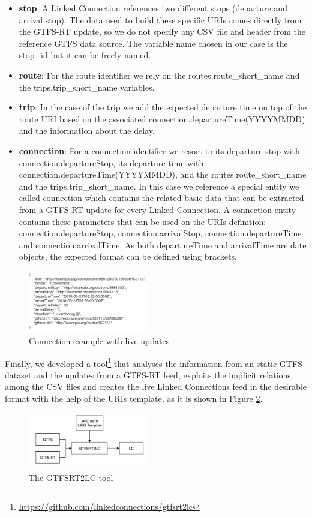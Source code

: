\documentclass[sw]{iosart2x}
\begin{document}
	\begin{itemize}
	\item \textbf{stop}: A Linked Connection references two different stops (departure and arrival stop). The data used to build these specific URIs comes directly from the GTFS-RT update, so we do not specify any CSV file and header from the reference GTFS data source. The variable name chosen in our case is the stop\_id but it can be freely named.
	\item \textbf{route}: For the route identifier we rely on the routes.route\_short\_name and the trips.trip\_short\_name variables.
	\item \textbf{trip}: In the case of the trip we add the expected departure time on top of the route URI based on the associated connection.departureTime(YYYYMMDD) and the information about the delay.
	\item \textbf{connection}: For a connection identifier we resort to its departure stop with connection.departureStop, its departure time with connection.departureTime(YYYYMMDD), and the routes.route\_short\_name and the trips.trip\_short\_name. In this case we reference a special entity we called connection which contains the related basic data that can be extracted from a GTFS-RT update for every Linked Connection. A connection entity contains these parameters that can be used on the URIs definition: connection.departureStop, connection.arrivalStop, connection.departureTime and connection.arrivalTime. As both departureTime and arrivalTime are date objects, the expected format can be defined using brackets.
	\end{itemize}
	
	\begin{figure}[t]
		\includegraphics[width=0.47\textwidth]{images/example_connection_rt.png}
		\caption{Connection example with live updates}\label{fig:connection_rt}
	\end{figure}
	
	Finally, we developed a tool\footnote{\url{https://github.com/linkedconnections/gtfsrt2lc}} that analyses the information from an static GTFS dataset and the updates from a GTFS-RT feed, exploits the implicit relations among the CSV files and creates the live Linked Connections feed in the desirable format with the help of the URIs template, as it is shown in Figure \ref{fig:gtfsrt2lc}.
	\begin{figure}[t]
		\includegraphics[width=0.47\textwidth]{images/gtfsrt2lc.png}
		\caption{The GTFSRT2LC tool}\label{fig:gtfsrt2lc}
	\end{figure}
	
\end{document}
